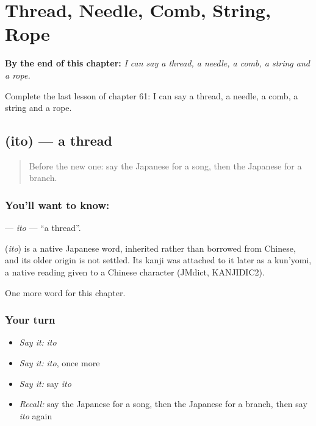 
\chapter{Thread, Needle, Comb, String, Rope}
\label{ch:ja-thread-needle-comb-string-rope}

\begin{chapteropening}
\textbf{By the end of this chapter:} \emph{I can say a thread, a needle, a comb, a string and a rope.}

Complete the last lesson of chapter 61: I can say a thread, a needle, a comb, a string and a rope.
\end{chapteropening}

\section[\texorpdfstring{\ja{いと} (ito)}{いと (ito)}]{ (ito) — a thread}

\label{lesson:JA-C61-ito}



\begin{quote}
Before the new one: say the Japanese for a song, then the Japanese for a branch.
\end{quote}

\subsection*{You'll want to know: }
\textbf{} — \emph{ito} — \textquotedblleft{}a thread\textquotedblright{}.

\begin{cousinweb}
\textbf{} (\emph{ito}) is a native Japanese word, inherited rather than borrowed from Chinese, and its older origin is not settled. Its kanji was attached to it later as a kun'yomi, a native reading given to a Chinese character (JMdict, KANJIDIC2).
\end{cousinweb}

\begin{grammarlens}[title={What you've built}]
One more word for this chapter.
\end{grammarlens}

\subsection*{Your turn}
\begin{itemize}
\raggedright
  \item \emph{Say it:} \emph{ito}
  \item \emph{Say it:} \emph{ito}, once more
  \item \emph{Say it:} say \emph{ito}
  \item \emph{Recall:} say the Japanese for a song, then the Japanese for a branch, then say \emph{ito} again
\end{itemize}

